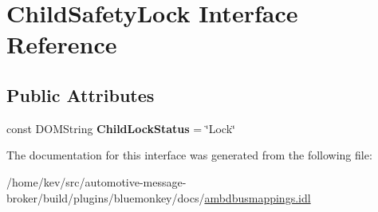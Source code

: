 \hypertarget{interfaceChildSafetyLock}{\section{Child\+Safety\+Lock Interface Reference}
\label{interfaceChildSafetyLock}
}
\subsection*{Public Attributes}
\begin{DoxyCompactItemize}
\item 
\hypertarget{interfaceChildSafetyLock_a9597ab8c513127f75063c19ff35cf2d3}{const D\+O\+M\+String {\bfseries Child\+Lock\+Status} = \char`\"{}Lock\char`\"{}}\label{interfaceChildSafetyLock_a9597ab8c513127f75063c19ff35cf2d3}

\end{DoxyCompactItemize}


The documentation for this interface was generated from the following file\+:\begin{DoxyCompactItemize}
\item 
/home/kev/src/automotive-\/message-\/broker/build/plugins/bluemonkey/docs/\hyperlink{ambdbusmappings_8idl}{ambdbusmappings.\+idl}\end{DoxyCompactItemize}
